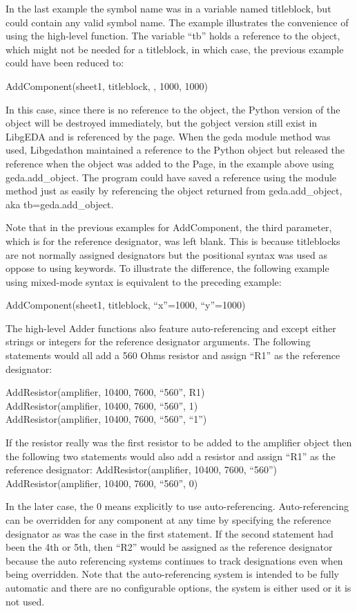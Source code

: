   In the last example the symbol name was in a variable named titleblock, but could contain any valid symbol name. The example illustrates the convenience of using the high-level function. The variable ``tb'' holds a reference to the object, which might not be needed for a titleblock, in which case, the previous example could have been reduced to:

AddComponent(sheet1, titleblock, , 1000, 1000)


  In this case, since there is no reference to the object, the Python version of the object will be destroyed immediately, but the gobject version still exist in LibgEDA and is referenced by the page. When the geda module method was used, Libgedathon maintained a reference to the Python object but released the reference when the object was added to the Page, in the example above using geda.add\_object. The program could have saved a reference using the module method just as easily by referencing the object returned from geda.add\_object, aka tb=geda.add\_object. 


  Note that in the previous examples for AddComponent, the third parameter, which is for the reference designator, was left blank. This is because titleblocks are not normally assigned designators but the positional syntax was used as oppose to using keywords. To illustrate the difference, the following example using mixed-mode syntax is equivalent to the preceding example:

AddComponent(sheet1, titleblock, ``x''=1000, ``y''=1000)


  The high-level Adder functions also feature auto-referencing and except either strings or integers for the reference designator arguments. The following statements would all add a 560 Ohms resistor and assign ``R1'' as the reference designator:

AddResistor(amplifier, 10400, 7600, ``560'', R1)
\\ 
AddResistor(amplifier, 10400, 7600, ``560'', 1)
\\ 
AddResistor(amplifier, 10400, 7600, ``560'', ``1'')


  If the resistor really was the first resistor to be added to the amplifier object then the following two statements would also add a resistor and assign ``R1'' as the reference designator: 
AddResistor(amplifier, 10400, 7600, ``560'')
\\ 
AddResistor(amplifier, 10400, 7600, ``560'', 0)


  In the later case, the 0 means explicitly to use auto-referencing. Auto-referencing can be overridden for any component at any time by specifying the reference designator as was the case in the first statement. If the second statement had been the 4th or 5th, then ``R2'' would be assigned as the reference designator because the auto referencing systems continues to track designations even when being overridden. Note that the auto-referencing system is intended to be fully automatic and there are no configurable options, the system is either used or it is not used. 


